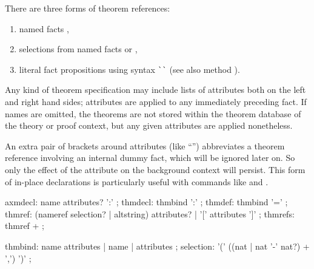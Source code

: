 \begin{isabellebody}
\begin{isamarkuptext}
  There are three forms of theorem references:
  \begin{enumerate}
  
  \item named facts ,

  \item selections from named facts  or ,

  \item literal fact propositions using \hyperlink{syntax.altstring}{\mbox{}} syntax
  \verb|`|\isa{{\isachardoublequote}{\isasymphi}{\isachardoublequote}}\verb|`| (see also method
  \hyperlink{method.fact}{\mbox{}}).

  \end{enumerate}

  Any kind of theorem specification may include lists of attributes
  both on the left and right hand sides; attributes are applied to any
  immediately preceding fact.  If names are omitted, the theorems are
  not stored within the theorem database of the theory or proof
  context, but any given attributes are applied nonetheless.

  An extra pair of brackets around attributes (like ``'') abbreviates a theorem reference involving an
  internal dummy fact, which will be ignored later on.  So only the
  effect of the attribute on the background context will persist.
  This form of in-place declarations is particularly useful with
  commands like \hyperlink{command.declare}{\mbox{}} and \hyperlink{command.using}{\mbox{}}.

  \begin{rail}
    axmdecl: name attributes? ':'
    ;
    thmdecl: thmbind ':'
    ;
    thmdef: thmbind '='
    ;
    thmref: (nameref selection? | altstring) attributes? | '[' attributes ']'
    ;
    thmrefs: thmref +
    ;

    thmbind: name attributes | name | attributes
    ;
    selection: '(' ((nat | nat '-' nat?) + ',') ')'
    ;
  \end{rail}%
\end{isamarkuptext}%
\isamarkuptrue%
%
\isadelimtheory
%
\endisadelimtheory
%
\isatagtheory
{}\isamarkupfalse%
%
\endisatagtheory
{\isafoldtheory}%
%
\isadelimtheory
%
\endisadelimtheory
\isanewline
\end{isabellebody}%
